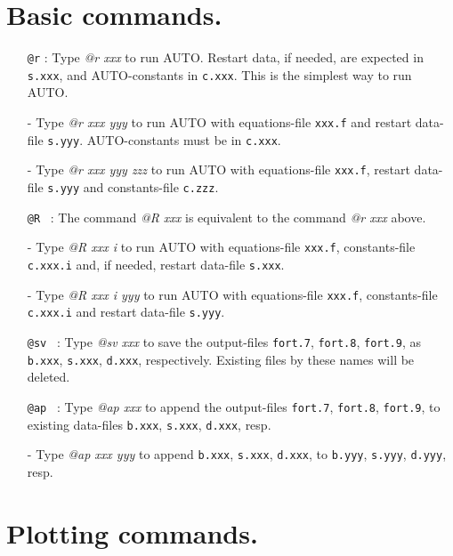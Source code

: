 \documentclass[12pt]{report}
\begin{document}
\section{ Basic commands.} 

\begin{itemize}
\item[\tt @r]:
  Type {\it @r xxx} to run {\cal AUTO}.
  Restart data, if needed, are expected in {\tt s.xxx},
  and {\cal AUTO}-constants in {\tt c.xxx}.
  This is the simplest way to run {\cal AUTO}.
\item[-]
  Type {\it @r xxx yyy} to run {\cal AUTO}
  with equations-file {\tt xxx.f} and restart data-file {\tt s.yyy}.
  {\cal AUTO}-constants must be in {\tt c.xxx}.
\item[-]
  Type {\it @r xxx yyy zzz} to run {\cal AUTO}
  with equations-file {\tt xxx.f}, restart data-file {\tt s.yyy}
  and constants-file {\tt c.zzz}.

\item[\tt @R]~:
  The command {\it @R xxx} is equivalent to the command {\it @r xxx} above.
\item[-]
  Type {\it @R xxx i}  to run {\cal AUTO} with equations-file {\tt xxx.f},
  constants-file {\tt c.xxx.i}
  and, if needed, restart data-file {\tt s.xxx}. 
\item[-]
  Type {\it @R xxx i yyy} to run {\cal AUTO}
  with equations-file {\tt xxx.f}, 
  constants-file {\tt c.xxx.i}
  and restart data-file {\tt s.yyy}.

\item[\tt @sv]~:
  Type {\it @sv xxx} to save the output-files 
  {\tt fort.7}, {\tt fort.8}, {\tt fort.9},
  as {\tt b.xxx}, {\tt s.xxx}, {\tt d.xxx}, respectively.
  Existing files by these names will be deleted.

\item[\tt @ap]~:
  Type {\it @ap xxx} to append the output-files 
  {\tt fort.7}, {\tt fort.8}, {\tt fort.9}, 
  to existing data-files 
  {\tt b.xxx}, {\tt s.xxx}, {\tt d.xxx}, resp.
\item[-]
  Type {\it @ap xxx yyy} 
  to append 
  {\tt b.xxx}, {\tt s.xxx}, {\tt d.xxx}, to
  {\tt b.yyy}, {\tt s.yyy}, {\tt d.yyy}, resp.
\end{itemize}

\section{ Plotting commands.} 
\end{document}
